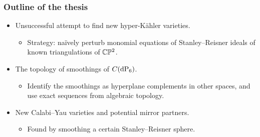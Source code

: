 \begin{frame}
\frametitle{Outline of the thesis}

\begin{itemize}
	\item Unsuccessful attempt to find new hyper-Kähler varieties.
	\begin{itemize}
		\item Strategy: naïvely perturb monomial equations of Stanley--Reisner ideals of known triangulations of $\mathbb{C} \mathbb{P}^2$.
	\end{itemize}
	\item The topology of smoothings of $C(\dP6)$.
	\begin{itemize}
		\item Identify the smoothings as hyperplane complements in other spaces, and use exact sequences from algebraic topology.
	\end{itemize}
	\item New Calabi--Yau varieties and potential mirror partners.
	\begin{itemize}
		\item Found by smoothing a certain Stanley--Reisner sphere.
	\end{itemize}
\end{itemize}

\end{frame}
